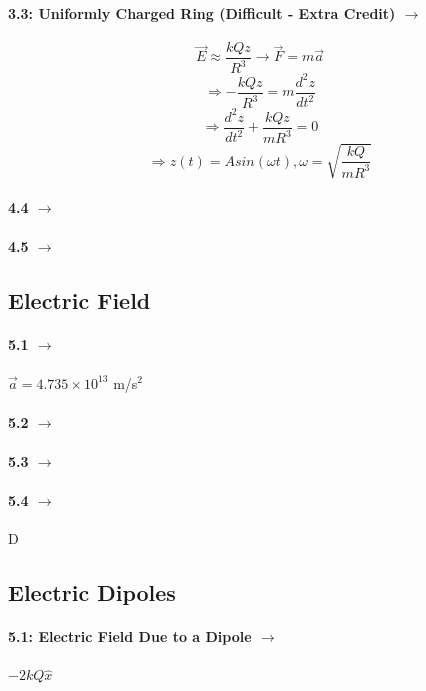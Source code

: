 \documentclass[11pt]{article}
\begin{document}
\paragraph{3.3: Uniformly Charged Ring (Difficult - Extra Credit) $\rightarrow$} 
\begin{equation}
\vec{E} \approx \frac{kQz}{R^3} \rightarrow \vec{F} = m \vec{a}
\end{equation}
\begin{equation}
\Rightarrow -\frac{kQz}{R^3} = m\frac{d^2z}{dt^2} 
\end{equation}
\begin{equation}
\Rightarrow \frac{d^2z}{dt^2} + \frac{kQz}{mR^3} = 0 
\end{equation}
\begin{equation}
\Rightarrow z(t) = Asin(\omega t), \omega = \sqrt{\frac{kQ}{mR^3}}
\end{equation}
\paragraph{4.4 $\rightarrow$}
\paragraph{4.5 $\rightarrow$}

\subsection*{Electric Field}
\paragraph{5.1 $\rightarrow$} $\vec{a} = 4.735 \times 10^{13}$ m/s$^2$
\paragraph{5.2 $\rightarrow$}
\paragraph{5.3 $\rightarrow$}
\paragraph{5.4 $\rightarrow$} D

\subsection*{Electric Dipoles}
\paragraph{5.1: Electric Field Due to a Dipole $\rightarrow$} $-2kQ \hat{x}$
\end{document}
